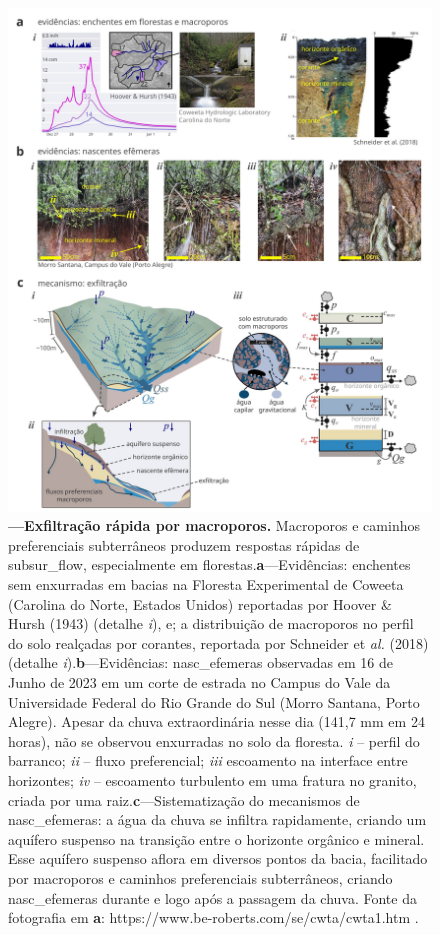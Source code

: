 \documentclass[./main.tex]{subfiles}
\begin{document}
\begin{figure}[t!] 
\centering				
\includegraphics[width=0.98\linewidth]{figs/fig_macropores.jpg}		
\caption[Exfiltração rápida por macroporos]
{\textbf{---\;Exfiltração rápida por macroporos.}
    Macroporos e caminhos preferenciais subterrâneos produzem respostas rápidas de \gls{subsur_flow}, especialmente em florestas.\;\textbf{a}\;---\;Evidências: enchentes sem enxurradas em bacias na Floresta Experimental de Coweeta (Carolina do Norte, Estados Unidos) reportadas por Hoover \& Hursh (1943) \cite{Hoover1943} (detalhe \textrm{\textit{i}}), e; a distribuição de macroporos no perfil do solo realçadas por corantes, reportada por Schneider et \textit{al.} (2018) \cite{Schneider2018} (detalhe \textrm{\textit{i}}).\;\textbf{b}\;---\;Evidências: \gls{nasc_efemeras} observadas em 16 de Junho de 2023 em um corte de estrada no Campus do Vale da Universidade Federal do Rio Grande do Sul (Morro Santana, Porto Alegre). Apesar da chuva extraordinária nesse dia (141,7 mm em 24 horas), não se observou enxurradas no solo da floresta. \textrm{\textit{i}} -- perfil do barranco; \textrm{\textit{ii}} -- fluxo preferencial; \textrm{\textit{iii}} escoamento na interface entre horizontes; \textrm{\textit{iv}} -- escoamento turbulento em uma fratura no granito, criada por uma raiz.\;\textbf{c}\;---\;Sistematização do mecanismos de \gls{nasc_efemeras}: a água da chuva se infiltra rapidamente, criando um aquífero suspenso na transição entre o horizonte orgânico e mineral. Esse aquífero suspenso aflora em diversos pontos da bacia, facilitado por macroporos e caminhos preferenciais subterrâneos, criando \gls{nasc_efemeras} durante e logo após a passagem da chuva. Fonte da fotografia em \textbf{a}: https://www.be-roberts.com/se/cwta/cwta1.htm .
}
\label{fig:hydro:macro} 		
\end{figure}
\end{document}
